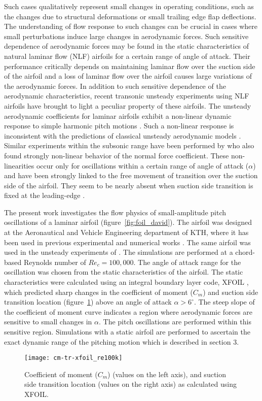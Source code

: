 Such cases qualitatively represent small changes in operating conditions, such as the changes due to structural deformations or small trailing edge flap deflections. The understanding of flow response to such changes can be crucial in cases where small perturbations induce large changes in aerodynamic forces. Such sensitive dependence of aerodynamic forces may be found in the static characteristics of natural laminar flow (NLF) airfoils for a certain range of angle of attack. Their performance critically depends on maintaining laminar flow over the suction side of the airfoil and a loss of laminar flow over the airfoil causes large variations of the aerodynamic forces. In addition to such sensitive dependence of the aerodynamic characteristics, recent transonic unsteady experiments using NLF airfoils have brought to light a peculiar property of these airfoils. The unsteady aerodynamic coefficients for laminar airfoils exhibit a non-linear dynamic response to simple harmonic pitch motions \citep{mai11,hebler13}. Such a non-linear response is inconsistent with the predictions of classical unsteady aerodynamic models \citep{theodorsen35}. Similar experiments within the subsonic range have been performed by \cite{lokattthesis} who also found strongly non-linear behavior of the normal force coefficient. These non-linearities occur only for oscillations within a certain range of angle of attack ($\alpha$) and have been strongly linked to the free movement of transition over the suction side of the airfoil. They seem to be nearly absent when suction side transition is fixed at the leading-edge \citep{mai11,lokattthesis}. 

The present work investigates the flow physics of small-amplitude pitch oscillations of a laminar airfoil (figure~\ref{fig:foil_david}). The airfoil was designed at the Aeronautical and Vehicle Engineering department of KTH, where it has been used in previous experimental and numerical works \citep{lokatt17}. The same airfoil was used in the unsteady experiments of \cite{lokattthesis}. The simulations are performed at a chord-based Reynolds number of $Re_{c}=100,000$. The angle of attack range for the oscillation was chosen from the static characteristics of the airfoil. The static characteristics were calculated using an integral boundary layer code, XFOIL \citep{drela89}, which predicted sharp changes in the coefficient of moment ($C_{m}$) and suction side transition location (figure~\ref{fig:xfoil_cm}) above an angle of attack $\alpha>6^{\circ}$. The steep slope of the coefficient of moment curve indicates a region where aerodynamic forces are sensitive to small changes in $\alpha$. The pitch oscillations are performed within this sensitive region. Simulations with a static airfoil are performed to ascertain the exact dynamic range of the pitching motion which is described in section 3.
\begin{figure}[h]
	\centering
	\texttt{[image: cm-tr-xfoil\_re100k]}
	\caption{Coefficient of moment ($C_{m}$) (values on the left axis), and suction side transition location (values on the right axis) as calculated using XFOIL.}
	\label{fig:xfoil_cm}
\end{figure}

